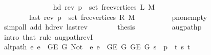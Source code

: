 \begin{isabellebody}
\ \ \ \ \ \ \isamarkupfalse%
\isanewline
\ \ \ \ \ \ \ \ {\isachardoublequoteopen}hd\ {\isacharparenleft}{\kern0pt}rev\ p{\isacharparenright}{\kern0pt}\ {\isasymin}\ set\ {\isacharparenleft}{\kern0pt}free{\isacharunderscore}{\kern0pt}vertices\ L\ M{\isacharparenright}{\kern0pt}{\isachardoublequoteclose}\isanewline
\ \ \ \ \ \ \ \ {\isachardoublequoteopen}last\ {\isacharparenleft}{\kern0pt}rev\ p{\isacharparenright}{\kern0pt}\ {\isasymin}\ set\ {\isacharparenleft}{\kern0pt}free{\isacharunderscore}{\kern0pt}vertices\ R\ M{\isacharparenright}{\kern0pt}{\isachardoublequoteclose}\isanewline
\ \ \ \ \ \ \ \ \isamarkupfalse%
\ p{\isacharunderscore}{\kern0pt}non{\isacharunderscore}{\kern0pt}empty\isanewline
\ \ \ \ \ \ \ \ \isamarkupfalse%
\ {\isacharparenleft}{\kern0pt}simp{\isacharunderscore}{\kern0pt}all\ add{\isacharcolon}{\kern0pt}\ hd{\isacharunderscore}{\kern0pt}rev\ last{\isacharunderscore}{\kern0pt}rev{\isacharparenright}{\kern0pt}\isanewline
\ \ \ \ \ \ \isamarkupfalse%
\ {\isacharquery}{\kern0pt}thesis\isanewline
\ \ \ \ \ \ \ \ \isamarkupfalse%
\ augpath{\isacharunderscore}{\kern0pt}p\isanewline
\ \ \ \ \ \ \ \ \isamarkupfalse%
\ {\isacharparenleft}{\kern0pt}intro\ that{\isacharparenright}{\kern0pt}\ {\isacharparenleft}{\kern0pt}rule\ augpath{\isacharunderscore}{\kern0pt}revI{\isacharparenright}{\kern0pt}\isanewline
\ \ \ \ \isamarkupfalse%
\isanewline
\ \ \ \ \isamarkupfalse%
\ {\isachardoublequoteopen}alt{\isacharunderscore}{\kern0pt}path\ {\isacharparenleft}{\kern0pt}{\isasymlambda}e{\isachardot}{\kern0pt}\ e\ {\isasymin}\ G{\isachardot}{\kern0pt}E\ {\isacharquery}{\kern0pt}G{}{\isacharparenright}{\kern0pt}\ {\isacharparenleft}{\kern0pt}Not\ {\isasymcirc}\ {\isacharparenleft}{\kern0pt}{\isasymlambda}e{\isachardot}{\kern0pt}\ e\ {\isasymin}\ G{\isachardot}{\kern0pt}E\ {\isacharquery}{\kern0pt}G{}{\isacharparenright}{\kern0pt}{\isacharparenright}{\kern0pt}\ {\isacharparenleft}{\kern0pt}G{\isachardot}{\kern0pt}E\ {\isacharquery}{\kern0pt}G{\isacharparenright}{\kern0pt}\ {\isacharparenleft}{\kern0pt}s\ {\isacharhash}{\kern0pt}\ p{\isacharprime}{\kern0pt}\ {\isacharat}{\kern0pt}\ {\isacharbrackleft}{\kern0pt}t{\isacharbrackright}{\kern0pt}{\isacharparenright}{\kern0pt}\ s\ t{\isachardoublequoteclose}\isanewline
\ \ \ \ \isamarkupfalse%
\ {\isacharminus}{\kern0pt}\isanewline
\ \ \ \ \ \ \isamarkupfalse%

\end{isabellebody}
